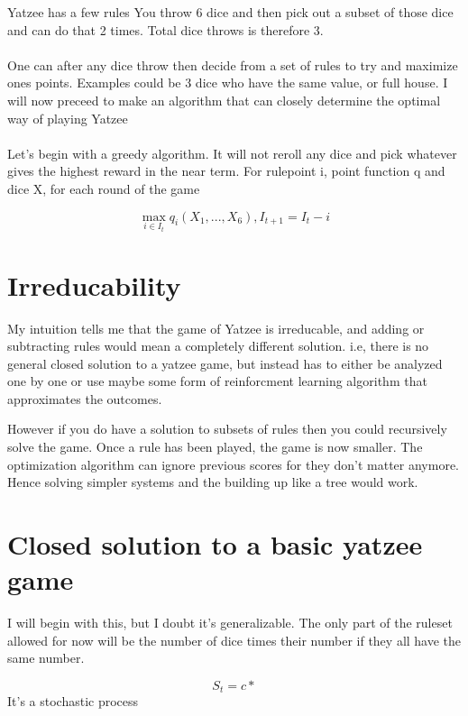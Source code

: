 \documentclass[a4paper,12pt]{article}
\begin{document}
Yatzee has a few rules
You throw 6 dice and then pick out a subset of those dice and can do that
2 times. Total dice throws is therefore 3.

\paragraph{}
One can after any dice throw then decide from a set of rules to try and maximize
ones points. Examples could be 3 dice who have the same value, or full house. I will
now preceed to make an algorithm that can closely determine the optimal way of playing
Yatzee

\paragraph{}
Let's begin with a greedy algorithm. It will not reroll any dice and pick whatever gives
the highest reward in the near term. For rulepoint i, point function q and dice X,
for each round of the game

$$\max_{i\in I_t} q_i({X_1,...,X_6}), I_{t+1} = I_t - i$$




\section{Irreducability}

My intuition tells me that the game of Yatzee is irreducable, and adding
or subtracting rules would mean a completely different solution. i.e, there is
no general closed solution to a yatzee game, but instead has to either be analyzed
one by one or use maybe some form of reinforcment learning algorithm that
approximates the outcomes.


However if you do have a solution to subsets of rules then you could
recursively solve the game. Once a rule has been played, the game is now smaller.
The optimization algorithm can ignore previous scores for they don't matter anymore.
Hence solving simpler systems and the building up like a tree would work.


\section{Closed solution to a basic yatzee game}

I will begin with this, but I doubt it's generalizable. The only part
of the ruleset allowed for now will be the number of dice times their number
if they all have the same number.

$$S_t = c*$$
It's a stochastic process
\end{document}
